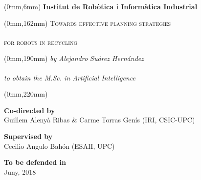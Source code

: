 \begin{titlingpage}
	\AddToShipoutPicture*{\BackgroundPic}
	
	\begin{textblock*}{205mm}(0mm,6mm)
		{\bfseries\sffamily\color{white}\LARGE\null\hfill Institut de Rob\`otica i Inform\`atica Industrial}
	\end{textblock*}
	
	\begin{textblock*}{205mm}(0mm,162mm)
		{\scshape\sffamily\color{white}\Huge\noindent\null\hfill Towards effective planning strategies\\\\%
		\null\hfill for robots in recycling}
	\end{textblock*}
	
	\begin{textblock*}{205mm}(0mm,190mm)
		{\itshape\sffamily\color{white}\LARGE\noindent\null\hfill by Alejandro Su\'arez Hern\'andez \\\\%
		\null\hfill to obtain the M.Sc. in Artificial Intelligence}
	\end{textblock*}
	
	\begin{textblock*}{210mm}(0mm,220mm)
		\begin{center}
		\textbf{Co-directed by}\\
		Guillem Aleny\`a Ribas \& Carme Torras Gen\'is  (IRI, CSIC-UPC)
		
		\vspace{0.5cm}
		
		\textbf{Supervised by}\\
		Cecilio Angulo Bah\'on (ESAII, UPC)
		
		\vspace{0.5cm}
		
		\textbf{To be defended in}\\
		Juny, 2018
		
		\end{center}
	\end{textblock*}
	
	\mbox{} %

\end{titlingpage}